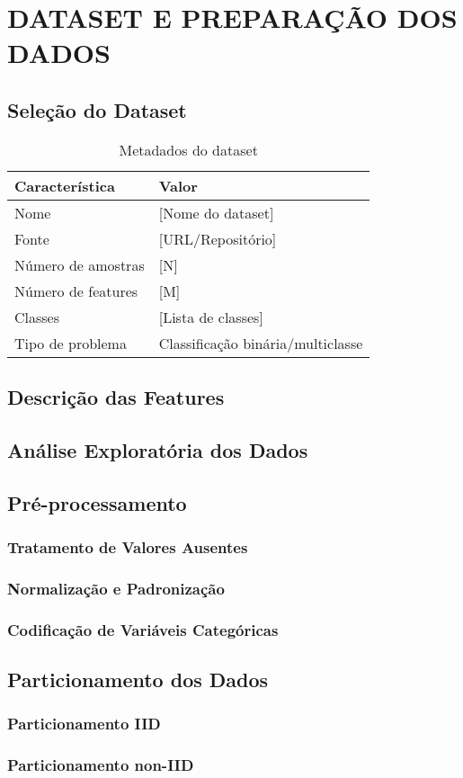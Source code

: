 \section{DATASET E PREPARAÇÃO DOS DADOS}

\subsection{Seleção do Dataset}

\begin{table}[H]
\centering
\begin{tabularx}{\textwidth}{|l|X|}
\hline
\bf Característica & \bf Valor \\ \hline
Nome & [Nome do dataset] \\ \hline
Fonte & [URL/Repositório] \\ \hline
Número de amostras & [N] \\ \hline
Número de features & [M] \\ \hline
Classes & [Lista de classes] \\ \hline
Tipo de problema & Classificação binária/multiclasse \\ \hline
\end{tabularx}
\caption{Metadados do dataset}
\label{tab:dataset_metadata}
\end{table}

\subsection{Descrição das Features}

\subsection{Análise Exploratória dos Dados}

\subsection{Pré-processamento}

\subsubsection{Tratamento de Valores Ausentes}

\subsubsection{Normalização e Padronização}

\subsubsection{Codificação de Variáveis Categóricas}

\subsection{Particionamento dos Dados}

\subsubsection{Particionamento IID}

\subsubsection{Particionamento non-IID}
